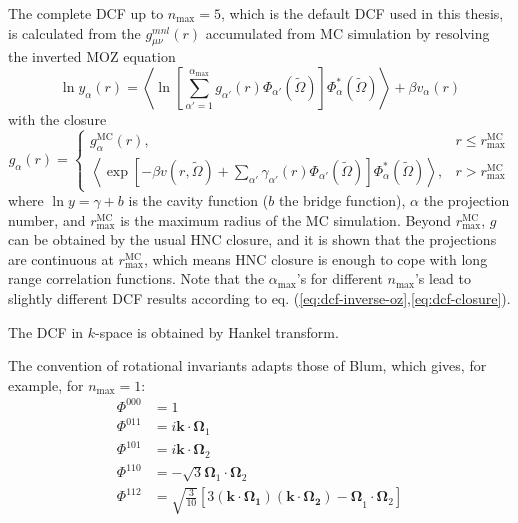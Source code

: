 The complete \acs{DCF} up to $n_{\max}=5$, which is the default
\acs{DCF} used in this thesis, is calculated from the $g_{\mu\nu}^{mnl}(r)$
accumulated from \acs{MC} simulation \citep{puibasset_bridge_2012}
by resolving the inverted \acs{MOZ} equation
\begin{equation}
\ln y_{\alpha}(r)=\left\langle \ln\left[\sum_{\alpha'=1}^{\alpha_{\max}}g_{\alpha'}(r)\Phi_{\alpha'}(\tilde{\Omega})\right]\Phi_{\alpha}^{*}(\tilde{\Omega})\right\rangle +\beta v_{\alpha}(r)\label{eq:dcf-inverse-oz}
\end{equation}
with the closure
\begin{equation}
g_{\alpha}(r)=\begin{cases}
g_{\alpha}^{\mathrm{MC}}(r), & r\leq r_{\max}^{\mathrm{MC}}\\
\left\langle \exp\left[-\beta v(r,\tilde{\Omega})+\sum_{\alpha'}\gamma_{\alpha'}(r)\Phi_{\alpha'}(\tilde{\Omega})\right]\Phi_{\alpha}^{*}(\tilde{\Omega})\right\rangle , & r>r_{\max}^{\mathrm{MC}}
\end{cases}\label{eq:dcf-closure}
\end{equation}
where $\ln y=\gamma+b$ is the cavity function ($b$ the bridge function),
$\alpha$ the projection number, and $r_{\max}^{\mathrm{MC}}$ is
the maximum radius of the \acs{MC} simulation. Beyond $r_{\max}^{\mathrm{MC}}$,
$g$ can be obtained by the usual \acs{HNC} closure, and it is shown
that the projections are continuous at $r_{\max}^{\mathrm{MC}}$,
which means \acs{HNC} closure is enough to cope with long range correlation
functions. Note that the $\alpha_{\max}$'s for different $n_{\max}$'s
lead to slightly different \acs{DCF} results according to eq. (\ref{eq:dcf-inverse-oz},\ref{eq:dcf-closure}). 

The \acs{DCF} in $k$-space is obtained by Hankel transform.

The convention of rotational invariants adapts those of Blum, which
gives, for example, for $n_{\max}=1$:
\begin{align}
\Phi^{000} & =1\nonumber \\
\Phi^{011} & =i\mathbf{k}\cdot\mathbf{\Omega}_{1}\nonumber \\
\Phi^{101} & =i\mathbf{k}\cdot\mathbf{\Omega}_{2}\nonumber \\
\Phi^{110} & =-\sqrt{3}\mathbf{\Omega}_{1}\cdot\mathbf{\Omega}_{2}\\
\Phi^{112} & =\sqrt{\frac{3}{10}}\left[3\mathbf{(\mathbf{k}\cdot\mathbf{\Omega}_{1})(\mathbf{k}\cdot\mathbf{\Omega}_{2})-\Omega}_{1}\cdot\mathbf{\Omega}_{2}\right]\nonumber 
\end{align}



